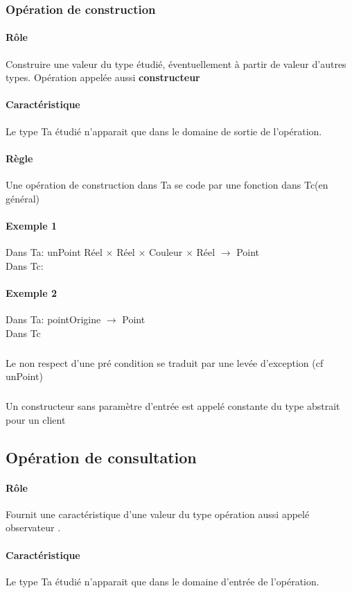 			\subsubsection{Opération de construction}
				\paragraph{Rôle}
					Construire une valeur du type étudié, éventuellement à partir de valeur d'autres types.
					Opération appelée aussi \textbf{constructeur} 
				\paragraph{Caractéristique}
					Le type Ta étudié n'apparait que dans le domaine de sortie de l'opération.
				\paragraph{Règle}
					Une opération de construction dans Ta se code par une fonction dans Tc(en général)	
				\paragraph{Exemple 1}
					Dans Ta:
					unPoint Réel $\times$ Réel $\times$ Couleur $\times$ Réel $\rightarrow$ Point \\
					Dans Tc: 	
					
				\paragraph{Exemple 2}
					Dans Ta: pointOrigine $\rightarrow$ Point\\
					Dans Tc
					
					\subparagraph{}
						Le non respect d'une pré condition se traduit par une levée d'exception (cf unPoint)
					\subparagraph{}
						Un constructeur sans paramètre d'entrée est appelé constante du type abstrait
						pour un client 
					
				\subsection{Opération de consultation}
					\paragraph{Rôle}
						Fournit une caractéristique d'une valeur du type opération aussi appelé observateur
						.
					\paragraph{Caractéristique}
						Le type Ta étudié n'apparait que dans le domaine d'entrée de l'opération. \\
